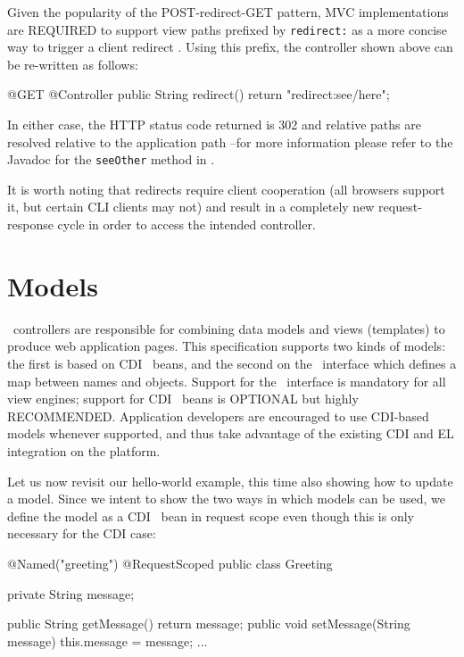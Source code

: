 Given the popularity of the POST-redirect-GET pattern, MVC implementations are REQUIRED to
support view paths prefixed by {\tt redirect:} as a more concise way to trigger a client redirect . Using this prefix, the controller shown above can be re-written as follows:

\begin{listing}{1}
@GET
@Controller
public String redirect() {
	return "redirect:see/here";
}
\end{listing}

In either case, the HTTP status code returned is 302 and relative paths are resolved 
relative to the application path --for more information please refer to the Javadoc for
the {\tt seeOther} method in \jaxrs.

It is worth noting that redirects require client cooperation (all browsers support it, but
certain CLI clients may not) and result in a completely new 
request-response cycle in order to access the intended controller.

\section{Models}
\label{models}

\mvc\ controllers are responsible for combining data models and views (templates) to 
produce web application pages. This specification supports two kinds of models: the
first is based on CDI \Named\ beans, and the second on the \Models\ interface
which defines a map between names and objects. Support for the \Models\ 
interface is mandatory for all view engines; support for CDI \Named\ beans is
OPTIONAL but highly RECOMMENDED. Application developers are encouraged to use CDI-based
models whenever supported, and thus take advantage of the existing CDI and EL integration
on the platform. 

Let us now revisit our hello-world example, this time also showing how to update
a model. Since we intent to show the two ways in which models can be used, we define the
model as a CDI \Named\ bean in request scope even though this is only necessary
for the CDI case:

\begin{listing}{1}
@Named("greeting")
@RequestScoped
public class Greeting {

	private String message;
	
	public String getMessage() { return message; }
	public void setMessage(String message) { this.message = message; }
	...
}
\end{listing}

